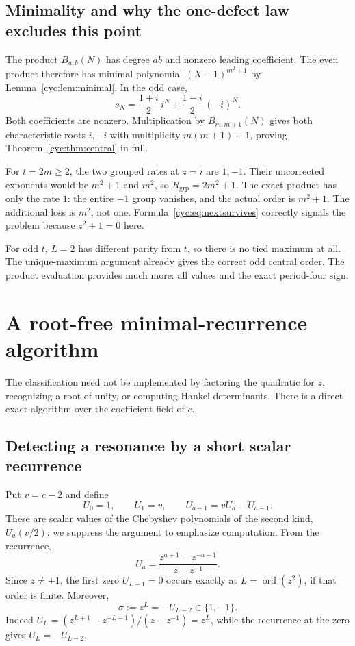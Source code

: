 \documentclass[11pt,a4paper]{article}
\numberwithin{equation}{section}
\theoremstyle{definition}
\theoremstyle{remark}
\newcommand{\ord}{\operatorname{ord}}
\newcommand{\Rgrp}{R_{\mathrm{grp}}}
\begin{document}
\subsection{Minimality and why the one-defect law excludes this point}
The product $B_{a,b}(N)$ has degree $ab$ and nonzero leading
coefficient.  The even product therefore has minimal polynomial
$(X-1)^{m^2+1}$ by Lemma~\ref{cyc:lem:minimal}.  In the odd case,
\begin{equation}\label{cyc:eq:signexp}
 s_N=\frac{1+i}{2}\,i^N+\frac{1-i}{2}\,(-i)^N.
\end{equation}
Both coefficients are nonzero.  Multiplication by $B_{m,m+1}(N)$
gives both characteristic roots $i,-i$ with multiplicity
$m(m+1)+1$, proving Theorem~\ref{cyc:thm:central} in full.

For $t=2m\ge2$, the two grouped rates at $z=i$ are $1,-1$.
Their uncorrected exponents would be $m^2+1$ and $m^2$, so
$\Rgrp=2m^2+1$.  The exact product has only the rate $1$: the
entire $-1$ group vanishes, and the actual order is $m^2+1$.
The additional loss is $m^2$, not one.  Formula~\eqref{cyc:eq:nextsurvives}
correctly signals the problem because $z^2+1=0$ here.

For odd $t$, $L=2$ has different parity from $t$, so there is no tied
maximum at all.  The unique-maximum argument already gives the correct
odd central order.  The product evaluation provides much more: all
values and the exact period-four sign.

\section{A root-free minimal-recurrence algorithm}\label{cyc:sec:algorithm}

The classification need not be implemented by factoring the quadratic
for $z$, recognizing a root of unity, or computing Hankel determinants.
There is a direct exact algorithm over the coefficient field of $c$.

\subsection{Detecting a resonance by a short scalar recurrence}
Put $v=c-2$ and define
\begin{equation}\label{cyc:eq:Urec}
 U_0=1,\qquad U_1=v,\qquad U_{a+1}=vU_a-U_{a-1}.
\end{equation}
These are scalar values of the Chebyshev polynomials of the second
kind, $U_a(v/2)$; we suppress the argument to emphasize computation.
From the recurrence,
\begin{equation}\label{cyc:eq:Uspectral}
 U_a=\frac{z^{a+1}-z^{-a-1}}{z-z^{-1}}.
\end{equation}
Since $z\ne\pm1$, the first zero $U_{L-1}=0$ occurs exactly at
$L=\ord(z^2)$, if that order is finite.  Moreover,
\begin{equation}\label{cyc:eq:sigmarootfree}
 \sigma:=z^L=-U_{L-2}\in\{1,-1\}.
\end{equation}
Indeed $U_L=(z^{L+1}-z^{-L-1})/(z-z^{-1})=z^L$, while the
recurrence at the zero gives $U_L=-U_{L-2}$.
\end{document}

